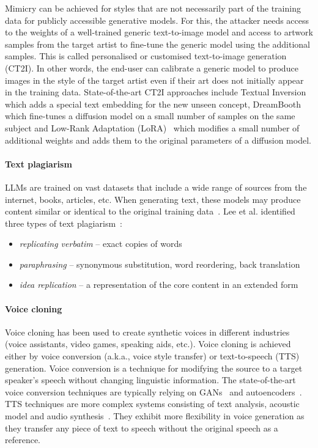 \documentclass[conference,table]{IEEEtran}
\begin{document}
Mimicry can be achieved for styles that are not necessarily part of the training data for publicly accessible generative models. For this, the attacker needs access to the weights of a well-trained generic text-to-image model and access to artwork samples from the target artist to fine-tune the generic model using the additional samples. 
This is called personalised or customised text-to-image generation (CT2I).
In other words, the end-user can calibrate a generic model to produce images in the style of the target artist even if their art does not initially appear in the training data. 
State-of-the-art CT2I approaches include Textual Inversion~\cite{gal_image_2022} which adds a special text embedding for the new unseen concept, DreamBooth~\cite{ruiz_dreambooth_2023} which fine-tunes a diffusion model on a small number of samples on the same subject and Low-Rank Adaptation (LoRA)~\cite{hu_lora_2021} which modifies a small number of additional weights and adds them to the original parameters of a diffusion model. 

\paragraph{Text plagiarism}
LLMs are trained on vast datasets that include a wide range of sources from the internet, books, articles, etc. 
When generating text, these models may produce content similar or identical to the original training data~\cite{carlini_extracting_2021,mccoy_how_2023}.
Lee et al. identified three types of text plagiarism~\cite{lee_language_2023}:
\begin{itemize}
    \item \textit{replicating verbatim} -- exact copies of words
    \item \textit{paraphrasing} -- synonymous substitution, word reordering, back translation 
    \item \textit{idea replication} -- a representation of the core content in an extended form
\end{itemize}

\paragraph{Voice cloning} 
Voice cloning has been used to create synthetic voices in different industries (voice assistants, video games, speaking aids, etc.).
Voice cloning is achieved either by voice conversion (a.k.a., voice style transfer) or text-to-speech (TTS) generation.
Voice conversion is a technique for modifying the source to a target speaker's speech without changing linguistic information.  
The state-of-the-art voice conversion techniques are typically relying on GANs~\cite{kaneko_cyclegan-vc2_2019} and autoencoders~\cite{qian_autovc_2019}. 
TTS techniques are more complex systems consisting of text analysis, acoustic model and audio synthesis~\cite{wang_tacotron_2017,ren_fastspeech_2022}. 
They exhibit more flexibility in voice generation as they transfer any piece of text to speech without the original speech as a reference.
\end{document}
